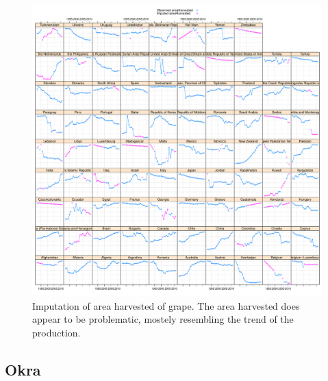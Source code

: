 \documentclass[nojss]{jss}\usepackage[]{graphicx}\usepackage[]{color}
\makeatletter
\def\maxwidth{ %
  \ifdim\Gin@nat@width>\linewidth
    \linewidth
  \else
    \Gin@nat@width
  \fi
}
\newenvironment{knitrout}{}{} %
\makeatother
\begin{document}
\begin{knitrout}
\color{fgcolor}\begin{figure}[!ht]


{\centering \includegraphics[width=\maxwidth]{figure/grape-areaharvested-imputed} 

}

\caption[Imputation of area harvested of grape]{Imputation of area harvested of grape. The area harvested does appear to be problematic, mostely resembling the trend of the production.\label{fig:grape-areaharvested-imputed}}
\end{figure}


\end{knitrout}



\FloatBarrier
\subsection{Okra}
\end{document}
